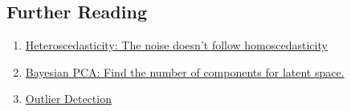 \documentclass[10pt,onecolumn,letterpaper]{article}
\begin{document}
\subsection{Further Reading}

\begin{enumerate}
\item \href{https://www.microsoft.com/en-us/research/uploads/prod/2006/01/Bishop-Pattern-Recognition-and-Machine-Learning-2006.pdf, page: 583-586}{Heteroscedasticity: The noise doesn't follow homoscedasticity}
\item \href{https://proceedings.neurips.cc/paper_files/paper/1998/file/c88d8d0a6097754525e02c2246d8d27f-Paper.pdf}{Bayesian PCA: Find the number of components for latent space.}
\item \href{https://www.sciencedirect.com/science/article/pii/S0167947309001248}{Outlier Detection}
\end{enumerate}

% 
% 
\end{document}
